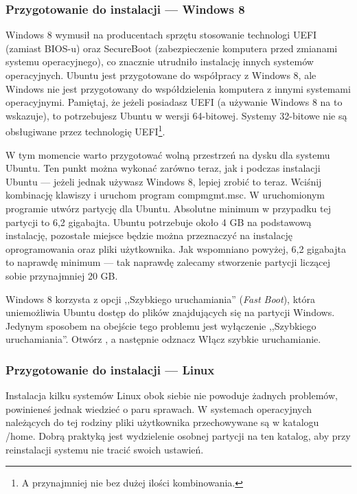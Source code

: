 \subsubsection{Przygotowanie do instalacji --- Windows 8}
\label{sec:przygotowanie_windows8}
Windows 8 wymusił na producentach sprzętu stosowanie technologi UEFI (zamiast BIOS-u) oraz SecureBoot (zabezpieczenie komputera przed zmianami systemu operacyjnego), co znacznie utrudniło instalację innych systemów operacyjnych. Ubuntu jest przygotowane do współpracy z Windows 8, ale Windows nie jest przygotowany do współdzielenia komputera z innymi systemami operacyjnymi. Pamiętaj, że jeżeli posiadasz UEFI (a używanie Windows 8 na to wskazuje), to potrzebujesz Ubuntu w wersji 64-bitowej. Systemy 32-bitowe nie są obsługiwane przez technologię UEFI\footnote{A przynajmniej nie bez dużej ilości kombinowania.}.

W tym momencie warto przygotować wolną przestrzeń na dysku dla systemu Ubuntu. Ten punkt można wykonać zarówno teraz, jak i podczas instalacji Ubuntu --- jeżeli jednak używasz Windows 8, lepiej zrobić to teraz. Wciśnij kombinację klawiszy  i uruchom program \textcolor{ubuntu_orange}{compmgmt.msc}. W uruchomionym programie utwórz partycję dla Ubuntu. Absolutne minimum w przypadku tej partycji to 6,2 gigabajta. Ubuntu potrzebuje około 4 GB na podstawową instalację, pozostałe miejsce będzie można przeznaczyć na instalację oprogramowania oraz pliki użytkownika. Jak wspomniano powyżej, 6,2 gigabajta to naprawdę minimum --- tak naprawdę zalecamy stworzenie partycji liczącej sobie przynajmniej 20 GB.

Windows 8 korzysta z opcji ,,Szybkiego uruchamiania'' (\textit{Fast Boot}), która uniemożliwia Ubuntu dostęp do plików znajdujących się na partycji Windows. Jedynym sposobem na obejście tego problemu jest wyłączenie ,,Szybkiego uruchamiania''. Otwórz , a następnie odznacz \textcolor{ubuntu_orange}{Włącz szybkie uruchamianie}.
\subsubsection{Przygotowanie do instalacji --- Linux}
\label{sec:przygotowanie_linux}
Instalacja kilku systemów Linux obok siebie nie powoduje żadnych problemów, powinieneś jednak wiedzieć o paru sprawach. W systemach operacyjnych należących do tej rodziny pliki użytkownika przechowywane są w katalogu /home. Dobrą praktyką jest wydzielenie osobnej partycji na ten katalog, aby przy reinstalacji systemu nie tracić swoich ustawień.

